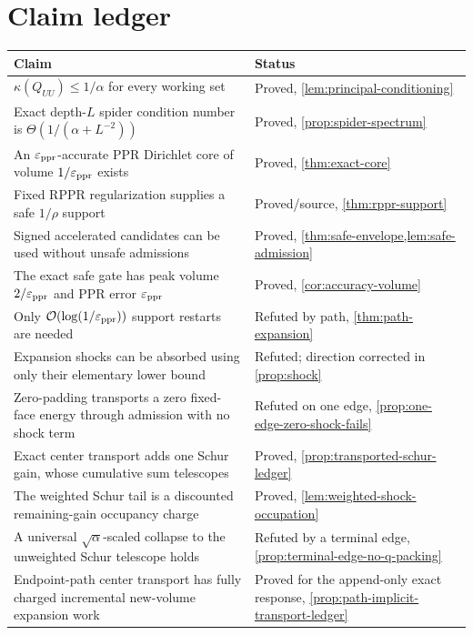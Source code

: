 \section{Claim ledger}
\label{sec:ledger}

\begin{center}
\small
\begin{tabularx}{\textwidth}{@{}X p{}@{}}
\toprule
Claim & Status \\
\midrule
$\kappa(Q_{UU})\leq1/\alpha$ for every working set & Proved,
\cref{lem:principal-conditioning} \\
Exact depth-$L$ spider condition number is
$\Theta(1/(\alpha+L^{-2}))$ & Proved, \cref{prop:spider-spectrum} \\
An $\varepsilon_{\mathrm{ppr}}$-accurate PPR Dirichlet core of volume $1/\varepsilon_{\mathrm{ppr}}$ exists &
Proved, \cref{thm:exact-core} \\
Fixed RPPR regularization supplies a safe $1/\rho$ support & Proved/source,
\cref{thm:rppr-support} \\
Signed accelerated candidates can be used without unsafe admissions & Proved,
\cref{thm:safe-envelope,lem:safe-admission} \\
The exact safe gate has peak volume $2/\varepsilon_{\mathrm{ppr}}$ and PPR error $\varepsilon_{\mathrm{ppr}}$ &
Proved, \cref{cor:accuracy-volume} \\
Only $\mathcal{O}(\log(1/\varepsilon_{\mathrm{ppr}}))$ support restarts are needed & Refuted by path,
\cref{thm:path-expansion} \\
Expansion shocks can be absorbed using only their elementary lower bound &
Refuted; direction corrected in \cref{prop:shock} \\
Zero-padding transports a zero fixed-face energy through admission with no
shock term & Refuted on one edge,
\cref{prop:one-edge-zero-shock-fails} \\
Exact center transport adds one Schur gain, whose cumulative sum telescopes &
Proved, \cref{prop:transported-schur-ledger} \\
The weighted Schur tail is a discounted remaining-gain occupancy charge &
Proved, \cref{lem:weighted-shock-occupation} \\
A universal $\sqrt\alpha$-scaled collapse to the unweighted Schur telescope
holds & Refuted by a terminal edge,
\cref{prop:terminal-edge-no-q-packing} \\
Endpoint-path center transport has fully charged incremental
new-volume expansion work & Proved for the append-only exact response,
\cref{prop:path-implicit-transport-ledger} \\

\end{tabularx}
\end{center}
